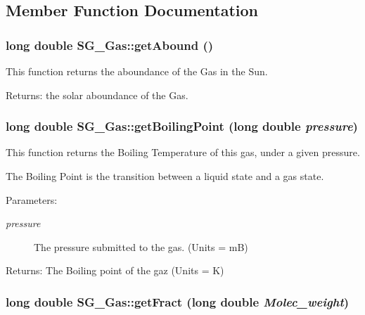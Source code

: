 \subsection{Member Function Documentation}
\subsubsection{\setlength{\rightskip}{0pt plus 5cm}long double SG\_\-Gas::get\-Abound ()}\label{class_s_g___gas_a2}


This function returns the aboundance of the Gas in the Sun. 

\begin{Desc}
\item[Returns:]the solar aboundance of the Gas. \end{Desc}
\subsubsection{\setlength{\rightskip}{0pt plus 5cm}long double SG\_\-Gas::get\-Boiling\-Point (long double {\em pressure})}\label{class_s_g___gas_a3}


This function returns the Boiling Temperature of this gas, under a given pressure. 

The Boiling Point is the transition between a liquid state and a gas state. \begin{Desc}
\item[Parameters:]
\begin{description}
\item[{\em pressure}]The pressure submitted to the gas. (Units = m\-B) \end{description}
\end{Desc}
\begin{Desc}
\item[Returns:]The Boiling point of the gaz (Units = K) \end{Desc}
\subsubsection{\setlength{\rightskip}{0pt plus 5cm}long double SG\_\-Gas::get\-Fract (long double {\em Molec\_\-weight})}\label{class_s_g___gas_a10}


